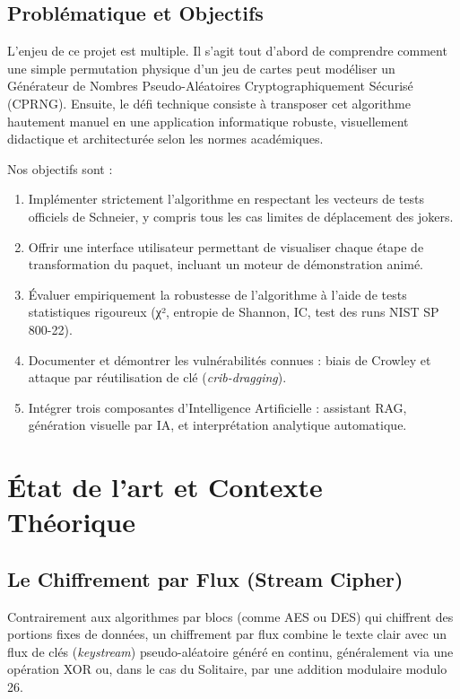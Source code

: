 \documentclass[12pt,a4paper]{article}
\begin{document}
\subsection{Problématique et Objectifs}
L'enjeu de ce projet est multiple. Il s'agit tout d'abord de comprendre comment une simple permutation physique d'un jeu de cartes peut modéliser un Générateur de Nombres Pseudo-Aléatoires Cryptographiquement Sécurisé (CPRNG). Ensuite, le défi technique consiste à transposer cet algorithme hautement manuel en une application informatique robuste, visuellement didactique et architecturée selon les normes académiques.

Nos objectifs sont :
\begin{enumerate}[label=\textbf{O\arabic*.}]
    \item Implémenter strictement l'algorithme en respectant les vecteurs de tests officiels de Schneier, y compris tous les cas limites de déplacement des jokers.
    \item Offrir une interface utilisateur permettant de visualiser chaque étape de transformation du paquet, incluant un moteur de démonstration animé.
    \item Évaluer empiriquement la robustesse de l'algorithme à l'aide de tests statistiques rigoureux (χ², entropie de Shannon, IC, test des runs NIST SP 800-22).
    \item Documenter et démontrer les vulnérabilités connues : biais de Crowley et attaque par réutilisation de clé (\textit{crib-dragging}).
    \item Intégrer trois composantes d'Intelligence Artificielle : assistant RAG, génération visuelle par IA, et interprétation analytique automatique.
\end{enumerate}

\section{État de l'art et Contexte Théorique}

\subsection{Le Chiffrement par Flux (Stream Cipher)}
Contrairement aux algorithmes par blocs (comme AES ou DES) qui chiffrent des portions fixes de données, un chiffrement par flux combine le texte clair avec un flux de clés (\textit{keystream}) pseudo-aléatoire généré en continu, généralement via une opération XOR ou, dans le cas du Solitaire, par une addition modulaire modulo 26.
\end{document}
